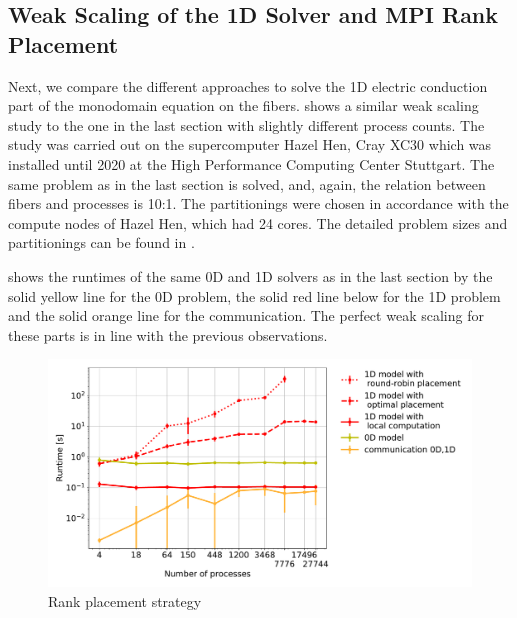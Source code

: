 
\subsection{Weak Scaling of the 1D Solver and MPI Rank Placement}\label{sec:mpi_rank_placement}


Next, we compare the different approaches to solve the 1D electric conduction part of the monodomain equation on the fibers.
 shows a similar weak scaling study to the one in the last section with slightly different process counts. The study was carried out on the supercomputer Hazel Hen, Cray XC30 which was installed until 2020 at the High Performance Computing Center Stuttgart. The same problem as in the last section is solved, and, again, the relation between fibers and processes is 10:1. The partitionings were chosen in accordance with the compute nodes of Hazel Hen, which had 24 cores. The detailed problem sizes and partitionings can be found in \cite{Maier2019}.

 shows the runtimes of the same 0D and 1D solvers as in the last section by the solid yellow line for the 0D problem, the solid red line below for the 1D problem and the solid orange line for the communication. The perfect weak scaling for these parts is in line with the previous observations.

\begin{figure}
  \centering%
  \includegraphics[width=\textwidth]{images/results/studies/Comparisonof0D-1Dcomputationschemes.pdf}%
  \caption{Rank placement strategy}%
   \label{fig:hazel_hen_rank_placement}%
\end{figure}

